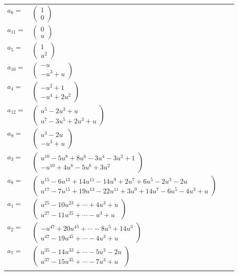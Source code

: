 \documentclass[1p]{elsarticle_modified}
\theoremstyle{definition}
\begin{document}
\begin{tabular}{m{7pt} m{180pt} m{7pt} m{180pt} }
\flushright $a_{6}=$&$\begin{pmatrix}1\\0\end{pmatrix}$ \\
\flushright $a_{11}=$&$\begin{pmatrix}0\\u\end{pmatrix}$ \\
\flushright $a_{5}=$&$\begin{pmatrix}1\\u^2\end{pmatrix}$ \\
\flushright $a_{10}=$&$\begin{pmatrix}- u\\- u^3+u\end{pmatrix}$ \\
\flushright $a_{4}=$&$\begin{pmatrix}- u^2+1\\- u^4+2 u^2\end{pmatrix}$ \\
\flushright $a_{12}=$&$\begin{pmatrix}u^5-2 u^3+u\\u^7-3 u^5+2 u^3+u\end{pmatrix}$ \\
\flushright $a_{9}=$&$\begin{pmatrix}u^3-2 u\\- u^3+u\end{pmatrix}$ \\
\flushright $a_{3}=$&$\begin{pmatrix}u^{10}-5 u^8+8 u^6-3 u^4-3 u^2+1\\- u^{10}+4 u^8-5 u^6+3 u^2\end{pmatrix}$ \\
\flushright $a_{8}=$&$\begin{pmatrix}u^{15}-6 u^{13}+14 u^{11}-14 u^9+2 u^7+6 u^5-2 u^3-2 u\\u^{17}-7 u^{15}+19 u^{13}-22 u^{11}+3 u^9+14 u^7-6 u^5-4 u^3+u\end{pmatrix}$ \\
\flushright $a_{1}=$&$\begin{pmatrix}u^{25}-10 u^{23}+\cdots+4 u^3+u\\u^{27}-11 u^{25}+\cdots- u^3+u\end{pmatrix}$ \\
\flushright $a_{2}=$&$\begin{pmatrix}- u^{47}+20 u^{45}+\cdots-8 u^5+14 u^3\\u^{47}-19 u^{45}+\cdots-4 u^3+u\end{pmatrix}$ \\
\flushright $a_{7}=$&$\begin{pmatrix}u^{35}-14 u^{33}+\cdots-5 u^3-2 u\\u^{37}-15 u^{35}+\cdots-7 u^3+u\end{pmatrix}$\\&\end{tabular}
\end{document}
